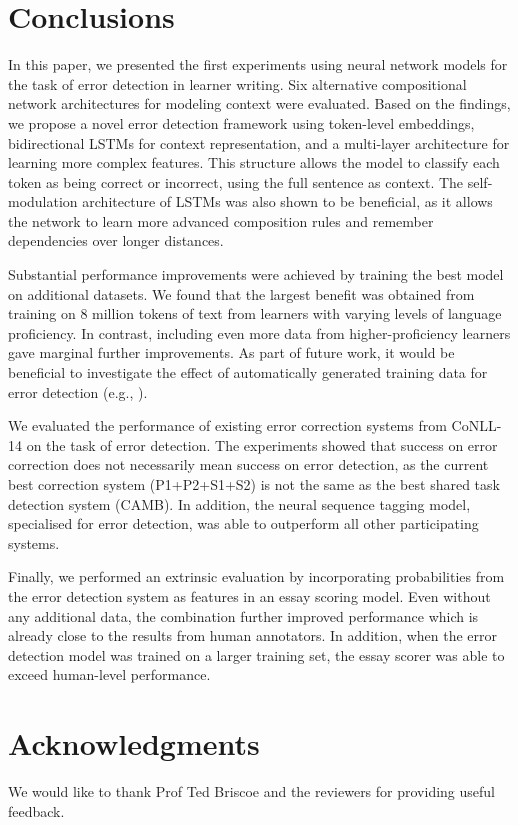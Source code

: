 \documentclass[11pt]{article}
\begin{document}
\section{Conclusions}

In this paper, we presented the first experiments using neural network models for the task of error detection in learner writing.
Six alternative compositional network architectures for modeling context were evaluated.
Based on the findings, we propose a novel error detection framework using token-level embeddings, bidirectional LSTMs for context representation, and a multi-layer architecture for learning more complex features.
This structure allows the model to classify each token as being correct or incorrect, using the full sentence as context. The self-modulation architecture of LSTMs was also shown to be beneficial, as it allows the network to learn more advanced composition rules and remember dependencies over longer distances.

Substantial performance improvements were achieved by training the best model on additional datasets. We found that the largest benefit was obtained from training on 8 million tokens of text from learners with varying levels of language proficiency. In contrast, including even more data from higher-proficiency learners gave marginal further improvements.
As part of future work, it would be beneficial to investigate the effect of automatically generated training data for error detection (e.g., ).

We evaluated the performance of existing error correction systems from CoNLL-14 on the task of error detection.
The experiments showed that success on error correction does not necessarily mean success on error detection, as the current best correction system (P1+P2+S1+S2) is not the same as the best shared task detection system (CAMB).
In addition, the neural sequence tagging model, specialised for error detection, was able to outperform all other participating systems.

Finally, we performed an extrinsic evaluation by incorporating probabilities from the error detection system as features in an essay scoring model. Even without any additional data, the combination further improved performance which is already close to the results from human annotators.
In addition, when the error detection model was trained on a larger training set, the essay scorer was able to exceed human-level performance.




\section*{Acknowledgments}

We would like to thank Prof Ted Briscoe and the reviewers for providing useful feedback.








\end{document}
